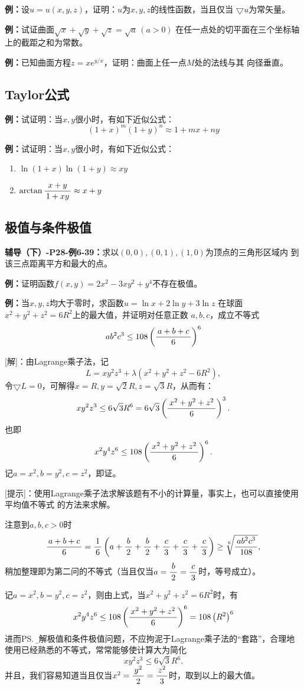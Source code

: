 {\bf 例：}设$u=u(x,y,z)$，证明：$u$为$x,y,z$的线性函数，当且仅当
$\bigtriangledown u$为常矢量。

{\bf 例：}试证曲面$\sqrt{x}+\sqrt y+\sqrt z=\sqrt a\,(a>0)$
在任一点处的切平面在三个坐标轴上的截距之和为常数。

{\bf 例：}已知曲面方程$z=xe^{y/x}$，证明：曲面上任一点$M$处的法线与其
向径垂直。

\subsection*{Taylor公式}

{\bf 例：}试证明：当$x,y$很小时，有如下近似公式：
$$(1+x)^m(1+y)^n\approx 1+mx+ny$$

{\bf 例：}试证明：当$x,y$很小时，有如下近似公式：
\begin{enumerate}[(1)]
  \setlength{\itemindent}{1cm}
  \item $\ln(1+x)\ln(1+y)\approx xy$
  \item $\arctan\displaystyle\frac{\,{x+y}\,}{\,{1+xy}\,}\approx x+y$
\end{enumerate}

\subsection*{极值与条件极值}

{\bf 辅导（下）-P28-例6-39：}求以$(0,0),(0,1),(1,0)$为顶点的三角形区域内
到该三点距离平方和最大的点。

{\bf 例：}证明函数$f(x,y)=2x^2-3xy^2+y^4$不存在极值。

{\bf 例：}当$x,y,z$均大于零时，求函数$u=\ln x+2\ln y+3\ln z$
在球面$x^2+y^2+z^2=6R^2$上的最大值，并证明对任意正数
$a,b,c$，成立不等式
$$ab^2c^3\leq 108\left(\displaystyle\frac{\,{a+b+c}\,}{\,{6}\,}\right)^6$$

[解]：由Lagrange乘子法，记
$$L=xy^2z^3+\lambda(x^2+y^2+z^2-6R^2),$$
令$\bigtriangledown L=0$，可解得$x=R,y=\sqrt2 R,z=\sqrt3 R$，从而有：
$$xy^2z^3\leq 6\sqrt 3R^6=6\sqrt 3\left(\displaystyle\frac{\,{x^2+y^2+z^2}\,}{\,{6}\,}\right)^3.$$
也即
$$x^2y^4z^6\leq 108\left(\displaystyle\frac{\,{x^2+y^2+z^2}\,}{\,{6}\,}\right)^6.$$
记$a=x^2,b=y^2,c=z^2$，即证。

[提示]：使用Lagrange乘子法求解该题有不小的计算量，事实上，也可以直接使用平均值不等式
的方法来求解。

注意到$a,b,c>0$时
$$\displaystyle\frac{\,{a+b+c}\,}{\,{6}\,}=\displaystyle\frac{\,{1}\,}{\,{6}\,}\left(a+\displaystyle\frac{\,{b}\,}{\,{2}\,}+\displaystyle\frac{\,{b}\,}{\,{2}\,}+\displaystyle\frac{\,{c}\,}{\,{3}\,}+\displaystyle\frac{\,{c}\,}{\,{3}\,}+\displaystyle\frac{\,{c}\,}{\,{3}\,}\right)
\geq \sqrt[6]{\displaystyle\frac{\,{ab^2c^3}\,}{\,{108}\,}},$$
稍加整理即为第二问的不等式（当且仅当$a=\displaystyle\frac{\,{b}\,}{\,{2}\,}=\displaystyle\frac{\,{c}\,}{\,{3}\,}$时，等号成立）。

记$a=x^2,b=y^2,c=z^2$，则由上式，当$x^2+y^2+z^2=6R^2$时，有
$$x^2y^4z^6\leq108\left(\displaystyle\frac{\,{x^2+y^2+z^2}\,}{\,{6}\,}\right)^6
=108\left(R^2\right)^6$$
进而\ps{\b 求解极值和条件极值问题，不应拘泥于Lagrange乘子法的“套路”，合理地
使用已经熟悉的不等式，常常能够使计算大为简化}
$$xy^2z^3\leq6\sqrt3R^6.$$
并且，我们容易知道当且仅当$x^2=\displaystyle\frac{\,{y^2}\,}{\,{2}\,}=\displaystyle\frac{\,{z^2}\,}{\,{3}\,}$时，取到以上的最大值。

